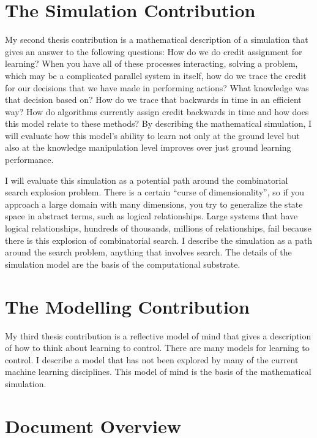 \section{The Simulation Contribution}

My second thesis contribution is a mathematical description of a
simulation that gives an answer to the following questions: How do we
do credit assignment for learning?  When you have all of these
processes interacting, solving a problem, which may be a complicated
parallel system in itself, how do we trace the credit for our
decisions that we have made in performing actions?  What knowledge was
that decision based on?  How do we trace that backwards in time in an
efficient way?  How do algorithms currently assign credit backwards in
time and how does this model relate to these methods?  By describing
the mathematical simulation, I will evaluate how this model's ability
to learn not only at the ground level but also at the knowledge
manipulation level improves over just ground learning performance.

I will evaluate this simulation as a potential path around the
combinatorial search explosion problem.  There is a certain ``curse of
dimensionality'', so if you approach a large domain with many
dimensions, you try to generalize the state space in abstract terms,
such as logical relationships.  Large systems that have logical
relationships, hundreds of thousands, millions of relationships, fail
because there is this explosion of combinatorial search.  I describe
the simulation as a path around the search problem, anything that
involves search.  The details of the simulation model are the basis of
the computational substrate.

\section{The Modelling Contribution}

My third thesis contribution is a reflective model of mind that gives
a description of how to think about learning to control.  There are
many models for learning to control.  I describe a model that has not
been explored by many of the current machine learning disciplines.
This model of mind is the basis of the mathematical simulation.

\section{Document Overview}

